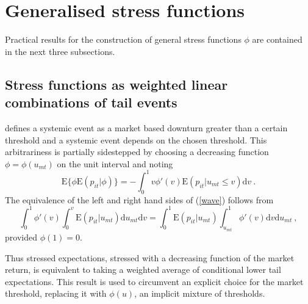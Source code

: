 \documentclass[12pt]{article}
\newcommand{\E}{\mathrm{E}}
\newcommand{\Ex}{{\cal E}}
\newcommand{\bi}{\begin{itemize}}
\newcommand{\ei}{\end{itemize}}
\renewcommand{\i}{\item}
\newcommand{\de}{\mathrm{d}}
\newcommand{\eref}[1]{(\ref{#1})}
\renewcommand{\P}{\mathrm{P}}
\newcommand{\be}[1]{\begin{equation}\label{#1}}
\newcommand{\ee}{\end{equation}}
\begin{document}

 \section{Generalised stress functions}\label{genstress}

Practical results for the  construction of general stress functions $\phi$ are contained in the next three subsections.


 \subsection{Stress functions as  weighted linear combinations of tail events}


\cite{brownlees2015} defines a systemic event as a market based downturn greater than a certain threshold and a systemic event  depends on the chosen threshold.   This arbitrariness is partially sidestepped by choosing a decreasing function $\phi=\phi(u_{mt})$ on the unit interval and noting
\be{wave}
\E\{\phi\E(p_{it}|\phi)\} = -\int_0^1 v\phi'(v)\E(p_{it}|u_{mt}\le v) \de v \ .
\ee
The equivalence of the left and right hand sides of \eref{wave}  follows from
$$
\int_0^1 \phi'(v)  \int_0^v \E(p_{it}|u_{mt})\de u_{mt}   \de v =\int_0^1\E(p_{it}|u_{mt})\int_{u_{mt}}^1  \phi'(v) \de v \de u_{mt}\ ,
$$
provided $\phi(1)=0$.

Thus stressed expectations, stressed with a decreasing function of the market return, is equivalent to taking a weighted average of conditional lower tail expectations.  This result is used to circumvent an explicit choice for the market threshold, replacing it with  $\phi(u)$, an implicit  mixture of thresholds.
\end{document}
